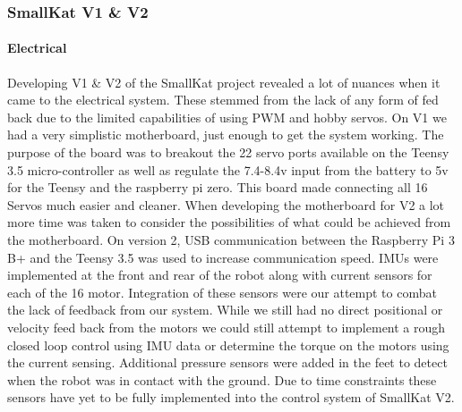 \subsubsection{SmallKat V1 \& V2}
    \paragraph{Electrical}
    Developing V1 \& V2 of the SmallKat project revealed a lot of nuances when it came to the electrical system. These stemmed from the lack of any form of fed back due to the limited capabilities of using PWM and hobby servos. On V1 we had a very simplistic motherboard, just enough to get the system working. The purpose of the board was to breakout the 22 servo ports available on the Teensy 3.5 micro-controller as well as regulate the 7.4-8.4v input from the battery to 5v for the Teensy and the raspberry pi zero. This board made connecting all 16 Servos much easier and cleaner. When developing the motherboard for V2 a lot more time was taken to consider the possibilities of what could be achieved from the motherboard. On version 2, USB communication between the Raspberry Pi 3 B+ and the Teensy 3.5 was used to increase communication speed. IMUs were implemented at the front and rear of the robot along with current sensors for each of the 16 motor. Integration of these sensors were our attempt to combat the lack of feedback from our system. While we still had no direct positional or velocity feed back from the motors we could still attempt to implement a rough closed loop control using IMU data or determine the torque on the motors using the current sensing. Additional pressure sensors were added in the feet to detect when the robot was in contact with the ground. Due to time constraints these sensors have yet to be fully implemented into the control system of SmallKat V2.
